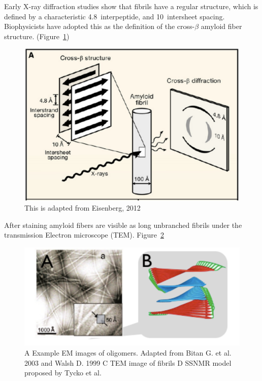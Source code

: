 Early X-ray diffraction studies show that fibrils have a regular structure, which is defined by a characteristic 4.8\angstrom\ interpeptide, and 10\angstrom\ intersheet spacing. Biophysicists have adopted this as the definition of the cross-$\beta$ amyloid fiber structure. (Figure~\ref{fig:fibril_diffraction})
\begin{figure}
  \centering
  \includegraphics[width=6in]{figures/introduction/fibril_structure_diffraction.pdf}
  \caption[Characteristic cross-$\beta$ spacings from X-ray fibre diffraction studies of amyloid fibrils]{This is adapted from Eisenberg, 2012}
  \label{fig:fibril_diffraction}
\end{figure}

After staining amyloid fibers are visible as long unbranched fibrils under the transmission Electron microscope (TEM). Figure~\ref{fig:fibril_TEM_SSNMR}
\begin{figure}
  \centering
  \includegraphics[width=6in]{figures/introduction/fibril_TEM_SSNMR.pdf}
  \caption[Characteristic cross-$\beta$ spacings from X-ray fibre diffraction studies of amyloid fibrils]{A Example EM images of oligomers.  Adapted from Bitan G. et al. 2003 and Walsh D. 1999 C TEM image of fibrils D SSNMR model proposed by Tycko et al.  }
  \label{fig:fibril_TEM_SSNMR}
\end{figure}

